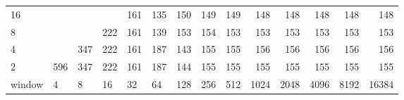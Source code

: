 \begin{table}[h]
{\begin{tabular}{lrrrrrrrrrrrrr}
			\multicolumn{1}{|l|}{16} &  &  &  & \cellcolor[HTML]{99E600}161 & \cellcolor[HTML]{99E600}135 & \cellcolor[HTML]{99E600}150 & \cellcolor[HTML]{99E600}149 & \cellcolor[HTML]{99E600}149 & \cellcolor[HTML]{99E600}148 & \cellcolor[HTML]{99E600}148 & \cellcolor[HTML]{99E600}148 & \cellcolor[HTML]{99E600}148 & \cellcolor[HTML]{99E600}148 \\ \cline{1-1}
			\multicolumn{1}{|l|}{8} &  &  & \cellcolor[HTML]{E69900}222 & \cellcolor[HTML]{99E600}161 & \cellcolor[HTML]{99E600}139 & \cellcolor[HTML]{99E600}153 & \cellcolor[HTML]{99E600}154 & \cellcolor[HTML]{99E600}153 & \cellcolor[HTML]{99E600}153 & \cellcolor[HTML]{99E600}153 & \cellcolor[HTML]{99E600}153 & \cellcolor[HTML]{99E600}153 & \cellcolor[HTML]{99E600}153 \\ \cline{1-1}
			\multicolumn{1}{|l|}{4} &   &  \cellcolor[HTML]{E60000}347 &  \cellcolor[HTML]{E69900}222 &  \cellcolor[HTML]{99E600}161 &  \cellcolor[HTML]{E69900}187 &  \cellcolor[HTML]{99E600}143 &  \cellcolor[HTML]{99E600}155 & \cellcolor[HTML]{99E600}155 &  \cellcolor[HTML]{99E600}156 &  \cellcolor[HTML]{99E600}156 &  \cellcolor[HTML]{99E600}156 &  \cellcolor[HTML]{99E600}156 &  \cellcolor[HTML]{99E600}156 \\ \cline{1-1}
			\multicolumn{1}{|l|}{2} &  \cellcolor[HTML]{4C00E6}596 &  \cellcolor[HTML]{E60000}347 &  \cellcolor[HTML]{E69900}222 &  \cellcolor[HTML]{99E600}161 &  \cellcolor[HTML]{E69900}187 &  \cellcolor[HTML]{99E600}144 &  \cellcolor[HTML]{99E600}155 &  \cellcolor[HTML]{99E600}155 &  \cellcolor[HTML]{99E600}155 &  \cellcolor[HTML]{99E600}155 &  \cellcolor[HTML]{99E600}155 &  \cellcolor[HTML]{99E600}155 &  \cellcolor[HTML]{99E600}155 \\ \hline
			\multicolumn{1}{l|}{window} & \multicolumn{1}{l|}{4} & \multicolumn{1}{l|}{8} & \multicolumn{1}{l|}{16} & \multicolumn{1}{l|}{32} & \multicolumn{1}{l|}{64} & \multicolumn{1}{l|}{128} & \multicolumn{1}{l|}{256} & \multicolumn{1}{l|}{512} & \multicolumn{1}{l|}{1024} & \multicolumn{1}{l|}{2048} & \multicolumn{1}{l|}{4096} & \multicolumn{1}{l|}{8192} & \multicolumn{1}{l|}{16384} \\ \cline{2-14} 
		\end{tabular}
	}
\end{table}



